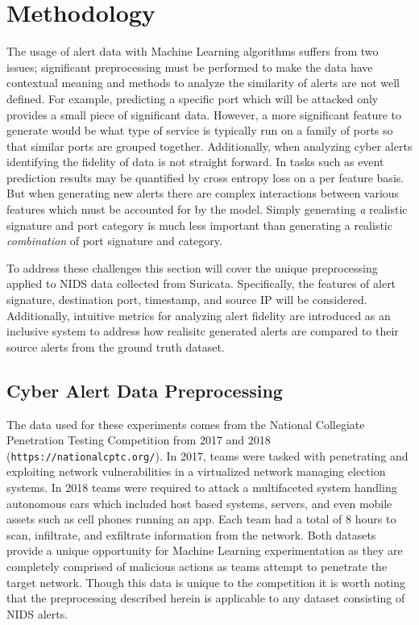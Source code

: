 \chapter{Methodology}

The usage of alert data with Machine Learning algorithms suffers from two issues; significant preprocessing must be performed to make the data have contextual meaning and methods to analyze the similarity of alerts are not well defined. For example, predicting a specific port which will be attacked only provides a small piece of significant data. However, a more significant feature to generate would be what type of service is typically run on a family of ports so that similar ports are grouped together. Additionally, when analyzing cyber alerts identifying the fidelity of data is not straight forward. In tasks such as event prediction results may be quantified by cross entropy loss on a per feature basis. But when generating new alerts there are complex interactions between various features which must be accounted for by the model. Simply generating \emph{a} realistic signature and port category is much less important than generating a realistic \emph{combination} of port signature and category. 

To address these challenges this section will cover the unique preprocessing applied to NIDS data collected from Suricata. Specifically, the features of alert signature, destination port, timestamp, and source IP will be considered. Additionally, intuitive metrics for analyzing alert fidelity are introduced as an inclusive system to address how realisitc generated alerts are compared to their source alerts from the ground truth dataset. 

\section{Cyber Alert Data Preprocessing}


The data used for these experiments comes from the National Collegiate Penetration Testing Competition from 2017 and 2018 (\texttt{https://nationalcptc.org/}). In 2017, teams were tasked with penetrating and exploiting network vulnerabilities in a virtualized network managing election systems. In 2018 teams were required to attack a multifaceted system handling autonomous cars which included host based systems, servers, and even mobile assets such as cell phones running an app. Each team had a total of 8 hours to scan, infiltrate, and exfiltrate information from the network. Both datasets provide a unique opportunity for Machine Learning experimentation as they are completely comprised of malicious actions as teams attempt to penetrate the target network. Though this data is unique to the competition it is worth noting that the preprocessing described herein is applicable to any dataset consisting of NIDS alerts.  

